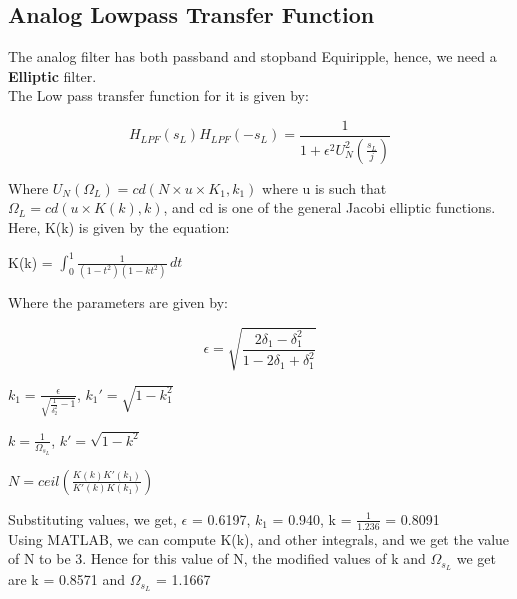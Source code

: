 \documentclass{article}
\begin{document}
\subsection{Analog Lowpass Transfer Function}

The analog filter has both passband and stopband Equiripple, hence, we need a \textbf{Elliptic} filter.\\

The Low pass transfer function for it is given by:
\begin{center}
    \begin{equation*}
        H_{LPF}(s_L)H_{LPF}(-s_L) = \frac{1}{1+\epsilon^2U^2_N(\frac{s_L}{j})}
    \end{equation*}
\end{center}

Where $U_N(\Omega_L) = cd(N \times u \times K_1,k_1)$ where u is such that $\Omega_L = cd(u \times K(k),k)$, and cd is one of the general Jacobi elliptic functions. Here, K(k) is given by the equation:

\begin{center}
         K(k) = \(\int_{0}^{1} \frac{1}{(1-t^2)(1-kt^2)} \,dt\)
\end{center}

Where the parameters are given by:

\begin{center}
    \begin{equation*}
        \epsilon = \sqrt{\frac{2\delta_1-\delta_1^2}{1-2\delta_1+\delta_1^2}}
    \end{equation*}
\end{center}

\begin{center}
   $
        k_1 = \frac{\epsilon}{\sqrt{\frac{1}{\delta_2^2}-1}}$,       
       $ k_1'=\sqrt{1-k_1^2}
    $
\end{center}

\begin{center}
    $k=\frac{1}{\Omega_{s_L}}$,   $k'=\sqrt{1-k^2}$
\end{center}

\begin{center}
    $N = ceil(\frac{K(k)K'(k_1)}{K'(k)K(k_1)})$
\end{center}

Substituting values, we get, $\epsilon$ = 0.6197, $k_1$ = 0.940, k = $\frac{1}{1.236}$ = 0.8091\\
Using MATLAB, we can compute K(k), and other integrals, and we get the value of N to be 3. Hence for this value of N, the modified values of k and $\Omega_{s_L}$ we get are k = 0.8571 and $\Omega_{s_L}$ = 1.1667\\
\end{document}
